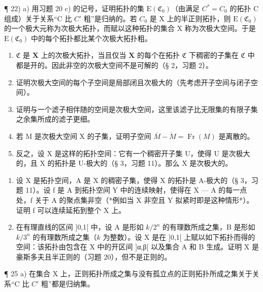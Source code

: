 ¶ 22) a) 用习题 20 c) 的记号，证明拓扑的集 \(\mathrm{E}(\mathfrak{C}_{0})\)（由满足 \(C^{*}=C_{0}\) 的拓扑 C 组成）关于关系“C 比 \(C'\) 粗”是归纳的。若 \(C_{0}\) 是 X 上的半正则拓扑，则 \(\mathrm{E}(\mathfrak{C}_{0})\) 的一个极大元称为次极大拓扑，而赋以这种拓扑的集合 X 称为次极大空间。于是 \(\mathrm{E}(\mathfrak{C}_{0})\) 中的每个拓扑都比某个次极大拓扑粗。

\begin{enumerate}
\def\labelenumi{\alph{enumi})}
\setcounter{enumi}{1}
\item
  \(\mathfrak{C}\) 是 \(\mathbf{X}\) 上的次极大拓扑，当且仅当 \(\mathbf{X}\) 的每个在拓扑 \(\mathfrak{C}\) 下稠密的子集在 \(\mathfrak{C}\) 中都是开的。因此非空的次极大空间不是可解的（§ 2，习题 2）。
\item
  证明次极大空间的每个子空间是局部闭且次极大的（先考虑开子空间与闭子空间）。
\item
  证明与一个滤子相伴随的空间是次极大空间，这里该滤子比无限集的有限子集之余集所成的滤子更细。
\item
  若 M 是次极大空间 X 的子集，证明子空间 \(\overline{M} - \mathring{M} = \operatorname{Fr}(M)\) 是离散的。
\item
  反之，设 X 是这样的拓扑空间：它有一个稠密开子集 U，使得 U 是次极大的，且 X 的拓扑是 U-极大的（§ 3，习题 11）。那么 X 是次极大的。
\end{enumerate}

\begin{enumerate}
\def\labelenumi{\arabic{enumi})}
\setcounter{enumi}{22}
\item
  设 X 是拓扑空间，A 是 X 的稠密子集，使得 X 的拓扑是 A-极大的（§ 3，习题 11）。设 f 是 A 到拓扑空间 Y 中的连续映射，使得在 X --- A 的每一点处，f 关于 A 的聚点集非空（*例如当 X 非空且 Y 拟紧时即是这种情形*）。证明 f 可以连续延拓到整个 X 上。
\item
  在有理直线的区间 {]}0,1{[} 中，设 A 是形如 \(k/2^n\) 的有理数所成之集，B 是形如 \(k/3^n\) 的有理数所成之集（\(k\) 为整数）。设 X 是在 {]}0,1{[} 上赋以如下拓扑而得的空间：该拓扑由包含在 X 中的开区间 {]}α,β{[} 以及集合 A 和 B 生成。证明 X 是豪斯多夫且半正则的（习题 20），但不是正则的。
\end{enumerate}

¶ 25 a) 在集合 X 上，正则拓扑所成之集与没有孤立点的正则拓扑所成之集关于关系“C 比 \(C'\) 粗”都是归纳集。

